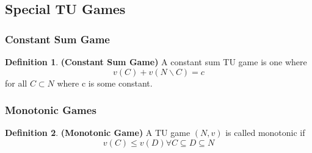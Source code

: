 \documentclass{article}
\theoremstyle{definition}
\newtheorem{defn}{Definition}[section]
\begin{document}
\subsection{Special TU Games}
\subsubsection{Constant Sum Game}
\begin{defn}
\textbf{(Constant Sum Game)} A constant sum TU game is one where $$v(C) + v(N\backslash C) = c$$ for all $C\subset N$ where c is some constant.
\end{defn}
\subsubsection{Monotonic Games}
\begin{defn}
\textbf{(Monotonic Game)} A TU game $(N,v)$ is called monotonic if $$v(C) \leq v(D) \forall C\subseteq D \subseteq N$$
\end{defn}
\end{document}
